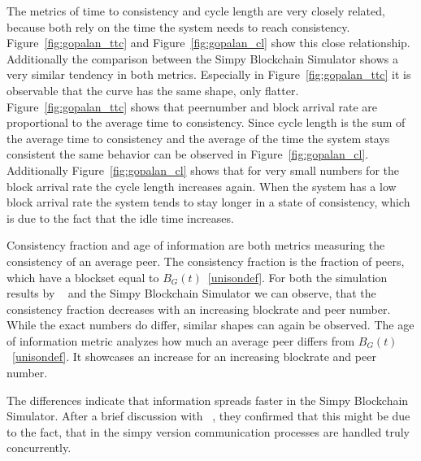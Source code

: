 The metrics of time to consistency and cycle length are very closely related, because both rely on the time the system needs to reach consistency.
Figure~\ref{fig:gopalan_ttc} and Figure~\ref{fig:gopalan_cl} show this close relationship. Additionally the comparison between the Simpy Blockchain Simulator shows a very similar tendency in both metrics. Especially in Figure~\ref{fig:gopalan_ttc} it is observable that the curve has the same shape, only flatter. Figure~\ref{fig:gopalan_ttc} shows that peernumber and block arrival rate are proportional to the average time to consistency. Since cycle length is the sum of the average time to consistency and the average of the time the system stays consistent the same behavior can be observed in Figure~\ref{fig:gopalan_cl}. Additionally Figure~\ref{fig:gopalan_cl} shows that for very small numbers for the block arrival rate the cycle length increases again. When the system has a low block arrival rate the system tends to stay longer in a state of consistency, which is due to the fact that the idle time increases.

Consistency fraction and age of information are both metrics measuring the consistency of an average peer. The consistency fraction is the fraction of peers, which have a blockset equal to $B_G(t)$~\ref{unisondef}. For both the simulation results by \gopalan~ and the Simpy Blockchain Simulator we can observe, that the consistency fraction decreases with an increasing blockrate and peer number. While the exact numbers do differ, similar shapes can again be observed.
The age of information metric analyzes how much an average peer differs from $B_G(t)$~\ref{unisondef}. It showcases an increase for an increasing blockrate and peer number.

The differences indicate that information spreads faster in the Simpy Blockchain Simulator. After a brief discussion with \gopalan~, they confirmed that this might be due to the fact, that in the simpy version communication processes are handled truly concurrently.	

